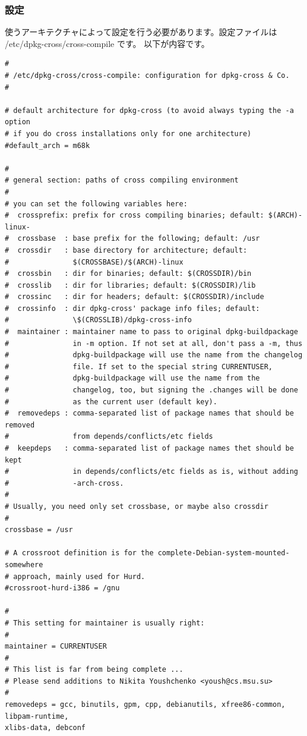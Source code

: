 \documentclass[mingoth]{jsarticle}
\begin{document}
\subsubsection{設定}
使うアーキテクチャによって設定を行う必要があります。設定ファイルは /etc/dpkg-cross/cross-compile です。
以下が内容です。
{\small
\begin{verbatim}
#
# /etc/dpkg-cross/cross-compile: configuration for dpkg-cross & Co.
#

# default architecture for dpkg-cross (to avoid always typing the -a option
# if you do cross installations only for one architecture)
#default_arch = m68k

#
# general section: paths of cross compiling environment
#
# you can set the following variables here:
#  crossprefix: prefix for cross compiling binaries; default: $(ARCH)-linux-
#  crossbase  : base prefix for the following; default: /usr
#  crossdir   : base directory for architecture; default:
#               $(CROSSBASE)/$(ARCH)-linux
#  crossbin   : dir for binaries; default: $(CROSSDIR)/bin
#  crosslib   : dir for libraries; default: $(CROSSDIR)/lib
#  crossinc   : dir for headers; default: $(CROSSDIR)/include
#  crossinfo  : dir dpkg-cross' package info files; default:
#               \$(CROSSLIB)/dpkg-cross-info
#  maintainer : maintainer name to pass to original dpkg-buildpackage
#               in -m option. If not set at all, don't pass a -m, thus
#               dpkg-buildpackage will use the name from the changelog
#               file. If set to the special string CURRENTUSER,
#               dpkg-buildpackage will use the name from the
#               changelog, too, but signing the .changes will be done
#               as the current user (default key).
#  removedeps : comma-separated list of package names that should be removed
#               from depends/conflicts/etc fields
#  keepdeps   : comma-separated list of package names thet should be kept
#               in depends/conflicts/etc fields as is, without adding
#               -arch-cross.
#
# Usually, you need only set crossbase, or maybe also crossdir
#
crossbase = /usr

# A crossroot definition is for the complete-Debian-system-mounted-somewhere
# approach, mainly used for Hurd.
#crossroot-hurd-i386 = /gnu

#
# This setting for maintainer is usually right:
#
maintainer = CURRENTUSER
#
# This list is far from being complete ...
# Please send additions to Nikita Youshchenko <yoush@cs.msu.su>
#
removedeps = gcc, binutils, gpm, cpp, debianutils, xfree86-common, libpam-runtime, 
xlibs-data, debconf


\end{verbatim}}
\end{document}
